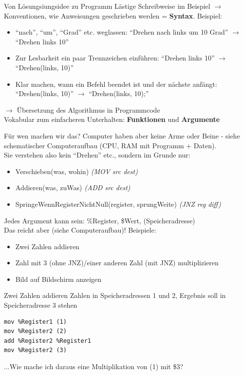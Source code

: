 \documentclass[aspectratio=169,t]{beamer}
\begin{document}
\begin{frame}{Von Lösungsiungsidee zu Programm}
	Lästige Schreibweise im Beispiel $\rightarrow$ Konventionen, wie Anweisungen geschrieben werden = \textbf{Syntax}. Beispiel:
	\begin{itemize}
		\item ``nach'', ``um'', ``Grad'' etc. weglassen: ``Drehen nach links um 10 Grad'' $\rightarrow$ ``Drehen links 10''
		\item Zur Lesbarkeit ein paar Trennzeichen einführen: ``Drehen links 10'' $\rightarrow$ ``Drehen(links, 10)''
		\item Klar machen, wann ein Befehl beendet ist und der nächste anfängt: ``Drehen(links, 10)'' $\rightarrow$ ``Drehen(links, 10);''
	\end{itemize}
	$\rightarrow$ Übersetzung des Algorithmus in Programmcode
	\\Vokabular zum einfacheren Unterhalten: \textbf{Funktionen} und \textbf{Argumente}
\end{frame}

\begin{frame}{Für wen machen wir das?}
	Computer haben aber keine Arme oder Beine - siehe schematischer Computeraufbau (CPU, RAM mit Programm + Daten).\\
	Sie verstehen also kein ``Drehen'' etc., sondern im Grunde nur:
	\begin{itemize}
		\item Verschieben(was, wohin) \textit{(MOV src dest)}
		\item Addieren(was, zuWas) \textit{(ADD src dest)}
		\item SpringeWennRegisterNichtNull(register, sprungWeite) \textit{(JNZ reg diff)}
	\end{itemize}
	Jedes Argument kann sein: \%Register, \$Wert, (Speicheradresse)\\
	Das reicht aber (siehe Computeraufbau)! Beispiele:
	\begin{itemize}
		\item Zwei Zahlen addieren
		\item Zahl mit 3 (ohne JNZ)/einer anderen Zahl (mit JNZ) multiplizieren
		\item Bild auf Bildschirm anzeigen
	\end{itemize}
\end{frame}

\begin{frame}[t,fragile]{Zwei Zahlen addieren}
	Zahlen in Speicheradressen 1 und 2, Ergebnis soll in Speicheradresse 3 stehen
	\lstset{language=[x86masm]Assembler,texcl=true}
	\begin{lstlisting}
mov %Register1 (1)
mov %Register2 (2)
add %Register2 %Register1
mov %Register2 (3)
	\end{lstlisting}
	...Wie mache ich daraus eine Multiplikation von (1) mit \$3?
\end{frame}
\end{document}
